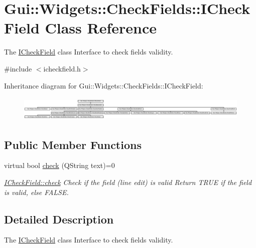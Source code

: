 \hypertarget{classGui_1_1Widgets_1_1CheckFields_1_1ICheckField}{\section{Gui\-:\-:Widgets\-:\-:Check\-Fields\-:\-:I\-Check\-Field Class Reference}
\label{classGui_1_1Widgets_1_1CheckFields_1_1ICheckField}
}


The \hyperlink{classGui_1_1Widgets_1_1CheckFields_1_1ICheckField}{I\-Check\-Field} class Interface to check fields validity.  




{\ttfamily \#include $<$icheckfield.\-h$>$}

Inheritance diagram for Gui\-:\-:Widgets\-:\-:Check\-Fields\-:\-:I\-Check\-Field\-:\begin{figure}[H]
\begin{center}
\leavevmode
\includegraphics[height=1.202749cm]{d7/d93/classGui_1_1Widgets_1_1CheckFields_1_1ICheckField}
\end{center}
\end{figure}
\subsection*{Public Member Functions}
\begin{DoxyCompactItemize}
\item 
virtual bool \hyperlink{classGui_1_1Widgets_1_1CheckFields_1_1ICheckField_a818700a4a8c95eacfc39b85c74e71144}{check} (Q\-String text)=0
\begin{DoxyCompactList}\small\item\em \hyperlink{classGui_1_1Widgets_1_1CheckFields_1_1ICheckField_a818700a4a8c95eacfc39b85c74e71144}{I\-Check\-Field\-::check} Check if the field (line edit) is valid Return T\-R\-U\-E if the field is valid, else F\-A\-L\-S\-E. \end{DoxyCompactList}\end{DoxyCompactItemize}


\subsection{Detailed Description}
The \hyperlink{classGui_1_1Widgets_1_1CheckFields_1_1ICheckField}{I\-Check\-Field} class Interface to check fields validity. 

